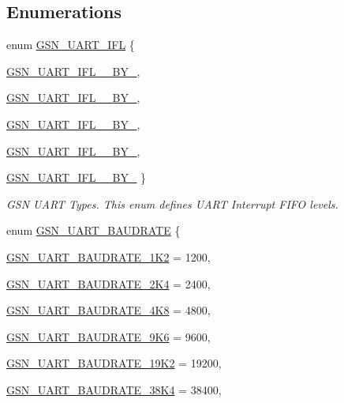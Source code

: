 \subsection*{Enumerations}
\begin{DoxyCompactItemize}
\item 
enum \hyperlink{a00656_gaca485e5a863be5b5c698317dc0ca469a}{GSN\_\-UART\_\-IFL} \{ \par
\hyperlink{a00656_ggaca485e5a863be5b5c698317dc0ca469aa93c61afd5e02a12497bda5028b4d41a7}{GSN\_\-UART\_\-IFL\_\_\-BY\_}, 
\par
\hyperlink{a00656_ggaca485e5a863be5b5c698317dc0ca469aaa635a1678c47b8dd453c5abd852bcba2}{GSN\_\-UART\_\-IFL\_\_\-BY\_}, 
\par
\hyperlink{a00656_ggaca485e5a863be5b5c698317dc0ca469aa7e8b61f4b331baf6a23f2fc55cb3901c}{GSN\_\-UART\_\-IFL\_\_\-BY\_}, 
\par
\hyperlink{a00656_ggaca485e5a863be5b5c698317dc0ca469aa1868476dfd4ebc2b4b5f1398ac4a4229}{GSN\_\-UART\_\-IFL\_\_\-BY\_}, 
\par
\hyperlink{a00656_ggaca485e5a863be5b5c698317dc0ca469aaa93754e8a359383590e2921b03352c9c}{GSN\_\-UART\_\-IFL\_\_\-BY\_}
 \}
\begin{DoxyCompactList}\small\item\em GSN UART Types. This enum defines UART Interrupt FIFO levels. \end{DoxyCompactList}\item 
enum \hyperlink{a00656_ga99b0d3d670ac3d61d3a8764fafc3b992}{GSN\_\-UART\_\-BAUDRATE} \{ \par
\hyperlink{a00656_gga99b0d3d670ac3d61d3a8764fafc3b992aed22e0e63c37a7729a6f5614093110f1}{GSN\_\-UART\_\-BAUDRATE\_\-1K2} =  1200, 
\par
\hyperlink{a00656_gga99b0d3d670ac3d61d3a8764fafc3b992aed8ca1e14912131fdb44b308117f95af}{GSN\_\-UART\_\-BAUDRATE\_\-2K4} =  2400, 
\par
\hyperlink{a00656_gga99b0d3d670ac3d61d3a8764fafc3b992adbb772f8e147d5259cc57829b8b7eb3b}{GSN\_\-UART\_\-BAUDRATE\_\-4K8} =  4800, 
\par
\hyperlink{a00656_gga99b0d3d670ac3d61d3a8764fafc3b992a75b9a7f05ac77527ee7764f25b7960ec}{GSN\_\-UART\_\-BAUDRATE\_\-9K6} =  9600, 
\par
\hyperlink{a00656_gga99b0d3d670ac3d61d3a8764fafc3b992ab5d1d0d38627c8c3bcef0eca6b258006}{GSN\_\-UART\_\-BAUDRATE\_\-19K2} =  19200, 
\par
\hyperlink{a00656_gga99b0d3d670ac3d61d3a8764fafc3b992ae0ca8c2c8d5eb96813089fe2b290556d}{GSN\_\-UART\_\-BAUDRATE\_\-38K4} =  38400, 

\end{DoxyCompactItemize}
